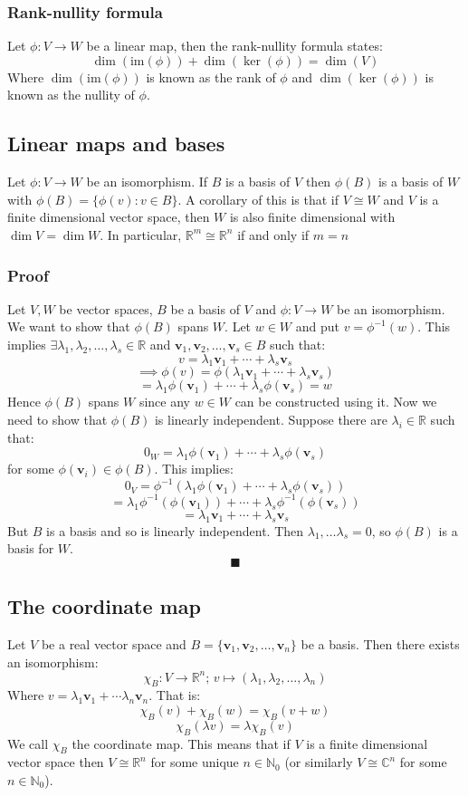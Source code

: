 \documentclass[12pt]{article}
\newcommand{\arbvec}[2]{\ensuremath{\textbf{#1}_1,\textbf{#1}_2,\dots,\textbf{#1}_{#2}}}
\newcommand{\arbreal}[2]{{#1}_1,{#1}_2,\dots,{#1}_{#2}}
\begin{document}
\subsubsection*{Rank-nullity formula}
Let \(\phi:V\to W\) be a linear map, then the rank-nullity formula states:
\[\dim(\text{im}(\phi))+\dim(\ker(\phi))=\dim(V)\]
Where \(\dim(\text{im}(\phi))\) is known as the rank of \(\phi\) and \(\dim(\ker(\phi))\) is known as the nullity of \(\phi\).
\subsection*{Linear maps and bases}
Let \(\phi:V\to W\) be an isomorphism. If \(B\) is a basis of \(V\) then \(\phi(B)\) is a basis of \(W\) with \(\phi(B)=\{\phi(v):v\in B\}\). A corollary of this is that if \(V\cong W\) and \(V\) is a finite dimensional vector space, then \(W\) is also finite dimensional with \(\dim V=\dim W\). In particular, \(\mathbb{R}^m\cong \mathbb{R}^n\) if and only if \(m=n\)
\subsubsection*{Proof}
Let \(V,W\) be vector spaces, \(B\) be a basis of \(V\) and \(\phi:V\to W\) be an isomorphism. We want to show that \(\phi(B)\) spans \(W\). Let \(w\in W\) and put \(v=\phi^{-1}(w)\). This implies \(\exists \arbreal{\lambda}{s}\in \mathbb{R}\) and \(\arbvec{v}{s}\in B\) such that:
\[v=\lambda_1\textbf{v}_1+\cdots +\lambda_s\textbf{v}_s\]
\[\implies \phi(v)=\phi(\lambda_1\textbf{v}_1+\cdots+\lambda_s\textbf{v}_s)\]
\[=\lambda_1\phi(\textbf{v}_1)+\cdots+\lambda_s\phi(\textbf{v}_s)=w\]
Hence \(\phi(B)\) spans \(W\) since any \(w\in W\) can be constructed using it. Now we need to show that \(\phi(B)\) is linearly independent. Suppose there are \(\lambda_i\in \mathbb{R}\) such that:
\[0_W=\lambda_1\phi(\textbf{v}_1)+\cdots+\lambda_s\phi(\textbf{v}_s)\]
for some \(\phi(\textbf{v}_i)\in \phi(B)\). This implies:
\[0_V=\phi^{-1}(\lambda_1\phi(\textbf{v}_1)+\cdots+\lambda_s\phi(\textbf{v}_s))\]
\[=\lambda_1\phi^{-1}(\phi(\textbf{v}_1))+\cdots+\lambda_s\phi^{-1}(\phi(\textbf{v}_s))\]
\[=\lambda_1\textbf{v}_1+\cdots+\lambda_s\textbf{v}_s\]
But \(B\) is a basis and so is linearly independent. Then \(\lambda_1,\dots\lambda_s=0\), so \(\phi(B)\) is a basis for \(W\).
\[\blacksquare\]
\subsection*{The coordinate map}
Let \(V\) be a real vector space and \(B=\{\arbvec{v}{n}\}\) be a basis. Then there exists an isomorphism:
\[\chi_B:V\to\mathbb{R}^n;\, v\mapsto (\arbreal{\lambda}{n})\]
Where \(v=\lambda_1\textbf{v}_1+\cdots \lambda_n\textbf{v}_n\). That is:
\[\chi_B(v)+\chi_B(w)=\chi_B(v+w)\]
\[\chi_B(\lambda v)=\lambda\chi_B(v)\]
We call \(\chi_B\) the coordinate map. This means that if \(V\) is a finite dimensional vector space then \(V\cong \mathbb{R}^n\) for some unique \(n\in \mathbb{N}_0\) (or similarly \(V\cong \mathbb{C}^n\) for some \(n\in \mathbb{N}_0\)).
\end{document}
